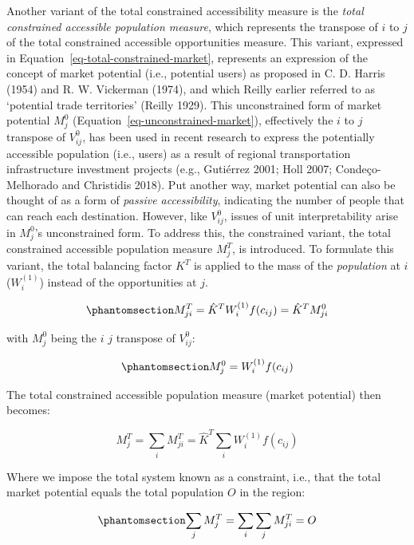 \documentclass[
]{article}
\begin{document}
Another variant of the total constrained accessibility measure is the
\emph{total constrained accessible population measure}, which represents
the transpose of \(i\) to \(j\) of the total constrained accessible
opportunities measure. This variant, expressed in
Equation~\ref{eq-total-constrained-market}, represents an expression of
the concept of market potential (i.e., potential users) as proposed in
C. D. Harris (1954) and R. W. Vickerman (1974), and which Reilly earlier
referred to as `potential trade territories' (Reilly 1929). This
unconstrained form of market potential \(M_j^0\)
(Equation~\ref{eq-unconstrained-market}), effectively the \(i\) to \(j\)
transpose of \(V^0_{ij}\), has been used in recent research to express
the potentially accessible population (i.e., users) as a result of
regional transportation infrastructure investment projects (e.g.,
Gutiérrez 2001; Holl 2007; Condeço-Melhorado and Christidis 2018). Put
another way, market potential can also be thought of as a form of
\emph{passive accessibility}, indicating the number of people that can
reach each destination. However, like \(V_{ij}^0\), issues of unit
interpretability arise in \(M_j^0\)'s unconstrained form. To address
this, the constrained variant, the total constrained accessible
population measure \(M^T_{j}\), is introduced. To formulate this
variant, the total balancing factor \(K^T\) is applied to the mass of
the \emph{population} at \(i\) (\(W_i^{(1)}\)) instead of the
opportunities at \(j\).

\begin{equation}\phantomsection\label{eq-total-constrained-market}{
M^T_{ji} = \hat K^T  W_i^{(1)} f(c_{ij}) = \hat K^T  M_{ji}^0
}\end{equation}

\noindent with \(M_j^0\) being the \(i\) \(j\) transpose of
\(V^0_{ij}\):

\begin{equation}\phantomsection\label{eq-unconstrained-market}{
M_j^0 = W_i^{(1)} f(c_{ij})
}\end{equation}

The total constrained accessible population measure (market potential)
then becomes:

\[
M^T_j = \sum_i M^T_{ji} = \hat K^T \sum_i W^{(1)}_if(c_{ij})
\]

Where we impose the total system known as a constraint, i.e., that the
total market potential equals the total population \(O\) in the region:

\begin{equation}\phantomsection\label{eq-total-constraint-market}{
\sum_j M^T_{j} = \sum_i\sum_j M^T_{ji} = O
}\end{equation}
\end{document}
